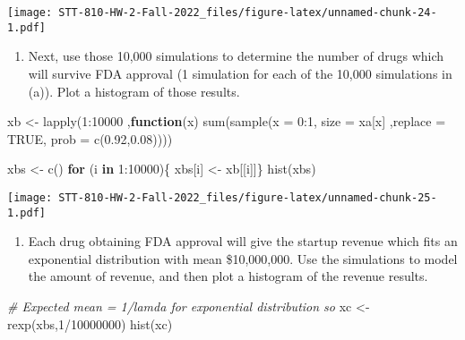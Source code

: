 \documentclass[
]{article}
\newenvironment{Shaded}{\begin{snugshade}}{\end{snugshade}}
\newcommand{\AttributeTok}[1]{\textcolor[rgb]{0.77,0.63,0.00}{#1}}
\newcommand{\CommentTok}[1]{\textcolor[rgb]{0.56,0.35,0.01}{\textit{#1}}}
\newcommand{\ConstantTok}[1]{\textcolor[rgb]{0.00,0.00,0.00}{#1}}
\newcommand{\ControlFlowTok}[1]{\textcolor[rgb]{0.13,0.29,0.53}{\textbf{#1}}}
\newcommand{\DecValTok}[1]{\textcolor[rgb]{0.00,0.00,0.81}{#1}}
\newcommand{\FloatTok}[1]{\textcolor[rgb]{0.00,0.00,0.81}{#1}}
\newcommand{\FunctionTok}[1]{\textcolor[rgb]{0.00,0.00,0.00}{#1}}
\newcommand{\NormalTok}[1]{#1}
\newcommand{\OtherTok}[1]{\textcolor[rgb]{0.56,0.35,0.01}{#1}}
\newcommand{\SpecialCharTok}[1]{\textcolor[rgb]{0.00,0.00,0.00}{#1}}
\providecommand{\tightlist}{%
  \setlength{\itemsep}{0pt}\setlength{\parskip}{0pt}}
\begin{document}
\texttt{[image: STT-810-HW-2-Fall-2022\_files/figure-latex/unnamed-chunk-24-1.pdf]}

\begin{enumerate}
\def\labelenumi{\alph{enumi}.}
\setcounter{enumi}{1}
\tightlist
\item
  Next, use those 10,000 simulations to determine the number of drugs
  which will survive FDA approval (1 simulation for each of the 10,000
  simulations in (a)). Plot a histogram of those results.
\end{enumerate}

\begin{Shaded}
\begin{Highlighting}[]
\NormalTok{xb }\OtherTok{\textless{}{-}} \FunctionTok{lapply}\NormalTok{(}\DecValTok{1}\SpecialCharTok{:}\DecValTok{10000}\NormalTok{ ,}\ControlFlowTok{function}\NormalTok{(x) }\FunctionTok{sum}\NormalTok{(}\FunctionTok{sample}\NormalTok{(}\AttributeTok{x =} \DecValTok{0}\SpecialCharTok{:}\DecValTok{1}\NormalTok{, }\AttributeTok{size =}\NormalTok{ xa[x] ,}\AttributeTok{replace =} \ConstantTok{TRUE}\NormalTok{, }\AttributeTok{prob =} \FunctionTok{c}\NormalTok{(}\FloatTok{0.92}\NormalTok{,}\FloatTok{0.08}\NormalTok{))))}

\NormalTok{xbs }\OtherTok{\textless{}{-}} \FunctionTok{c}\NormalTok{()}
\ControlFlowTok{for}\NormalTok{ (i }\ControlFlowTok{in} \DecValTok{1}\SpecialCharTok{:}\DecValTok{10000}\NormalTok{)\{}
\NormalTok{  xbs[i] }\OtherTok{\textless{}{-}}\NormalTok{ xb[[i]]\}}
\FunctionTok{hist}\NormalTok{(xbs)}
\end{Highlighting}
\end{Shaded}

\texttt{[image: STT-810-HW-2-Fall-2022\_files/figure-latex/unnamed-chunk-25-1.pdf]}

\begin{enumerate}
\def\labelenumi{\alph{enumi}.}
\setcounter{enumi}{2}
\tightlist
\item
  Each drug obtaining FDA approval will give the startup revenue which
  fits an exponential distribution with mean \$10,000,000. Use the
  simulations to model the amount of revenue, and then plot a histogram
  of the revenue results.
\end{enumerate}

\begin{Shaded}
\begin{Highlighting}[]
\CommentTok{\# Expected mean = 1/lamda for exponential distribution so }
\NormalTok{xc }\OtherTok{\textless{}{-}} \FunctionTok{rexp}\NormalTok{(xbs,}\DecValTok{1}\SpecialCharTok{/}\DecValTok{10000000}\NormalTok{)}
\FunctionTok{hist}\NormalTok{(xc)}
\end{Highlighting}
\end{Shaded}
\end{document}
